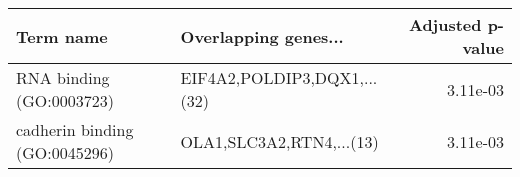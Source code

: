 \begin{tabular}{llr}
\toprule
                    Term name &        Overlapping genes... &  Adjusted p-value \\
\midrule
     RNA binding (GO:0003723) & EIF4A2,POLDIP3,DQX1,...(32) &          3.11e-03 \\
cadherin binding (GO:0045296) &    OLA1,SLC3A2,RTN4,...(13) &          3.11e-03 \\
\bottomrule
\end{tabular}
